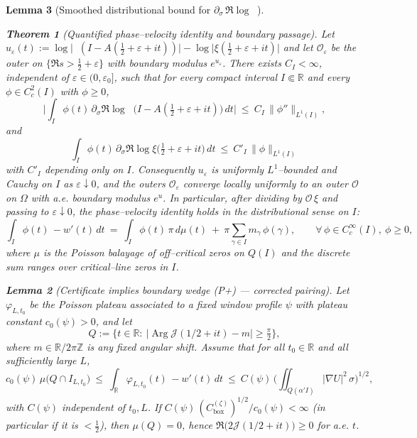 \documentclass[11pt]{article}
\newtheorem{theorem}{Theorem}
\newtheorem{lemma}[theorem]{Lemma}
\theoremstyle{definition}
\theoremstyle{remark}
\newcommand{\R}{\mathbb{R}}
\DeclareMathOperator{\dettwo}{det_2}
\DeclareMathOperator{\Arg}{Arg}
\begin{document}
\begin{lemma}[Smoothed distributional bound for $\partial_\sigma\,\Re\log\dettwo$]
\begin{theorem}[Quantified phase–velocity identity and boundary passage]\label{thm:phase-velocity-quant}
Let $u_\varepsilon(t):=\log\big|\dettwo(I-A(\tfrac12+\varepsilon+it))\big| - \log\big|\xi(\tfrac12+\varepsilon+it)\big|$ and let $\mathcal O_\varepsilon$ be the outer on $\{\Re s>\tfrac12+\varepsilon\}$ with boundary modulus $e^{u_\varepsilon}$. There exists $C_I<\infty$, independent of $\varepsilon\in(0,\varepsilon_0]$, such that for every compact interval $I\Subset\R$ and every $\phi\in C_c^2(I)$ with $\phi\ge 0$,
\[
 \Big|\int_I \phi(t)\,\partial_\sigma\Re\log\dettwo\big(I-A(\tfrac12+\varepsilon+it)\big)\,dt\Big|\ \le\ C_I\,\|\phi''\|_{L^1(I)},
\]
and
\[
 \int_I \phi(t)\,\partial_\sigma\Re\log\xi\big(\tfrac12+\varepsilon+it\big)\,dt\ \le\ C'_I\,\|\phi\|_{L^1(I)}
\]
with $C'_I$ depending only on $I$. Consequently $u_\varepsilon$ is uniformly $L^1$–bounded and Cauchy on $I$ as $\varepsilon\downarrow 0$, and the outers $\mathcal O_\varepsilon$ converge locally uniformly to an outer $\mathcal O$ on $\Omega$ with a.e. boundary modulus $e^{u}$. In particular, after dividing by $\mathcal O\,\xi$ and passing to $\varepsilon\downarrow 0$, the phase–velocity identity holds in the distributional sense on $I$:
\[
 \int_I \phi(t)\,-w'(t)\,dt\ =\ \int_I \phi(t)\,\pi\,d\mu(t)\ +\ \pi\sum_{\gamma\in I} m_\gamma\,\phi(\gamma),\qquad \forall\,\phi\in C_c^\infty(I),\ \phi\ge 0,
\]
where $\mu$ is the Poisson balayage of off–critical zeros on $Q(I)$ and the discrete sum ranges over critical–line zeros in $I$.
\end{theorem}

\begin{lemma}[Certificate implies boundary wedge (P+) — corrected pairing]\label{lem:window-to-wedge}
Let $\varphi_{L,t_0}$ be the Poisson plateau associated to a fixed window profile $\psi$
with plateau constant $c_0(\psi)>0$, and let
\[
 Q := \bigl\{t\in\mathbb R:\ |\Arg \mathcal J(1/2+it)-m|\ge \tfrac{\pi}{2}\bigr\},
\]
where $m\in\mathbb R/2\pi\mathbb Z$ is any fixed angular shift. Assume that for all $t_0\in\mathbb R$ and all sufficiently large $L$,
\begin{equation}\label{eq:window-certificate}
 c_0(\psi)\,\mu\big(Q\cap I_{L,t_0}\big)\ \le\
 \int_{\mathbb R} \varphi_{L,t_0}(t)\,-w'(t)\,dt\
 \le\ C(\psi)\,\Big(\iint_{Q(\alpha'I)} |\nabla U|^2\,\sigma\Big)^{1/2},
\end{equation}
with $C(\psi)$ independent of $t_0,L$. If $C(\psi)\,(C_{\mathrm{box}}^{(\zeta)})^{1/2}/c_0(\psi)<\infty$ (in particular if it is $<\tfrac12$), then $\mu(Q)=0$, hence $\Re\bigl(2\mathcal J(1/2+it)\bigr)\ge 0$ for a.e. $t$.
\end{lemma}


\end{lemma}
\end{document}
